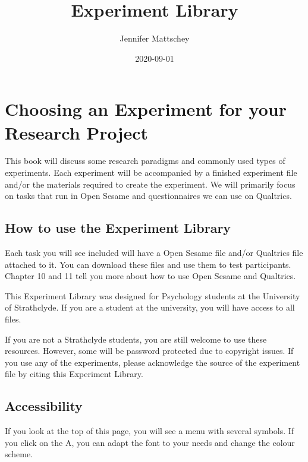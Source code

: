 \documentclass[
]{book}
\title{Experiment Library}
\author{Jennifer Mattschey}
\date{2020-09-01}
\begin{document}
\maketitle

{
\setcounter{tocdepth}{1}
\tableofcontents
}
\hypertarget{choosing-an-experiment-for-your-research-project}{%
\chapter{Choosing an Experiment for your Research Project}\label{choosing-an-experiment-for-your-research-project}}

This book will discuss some research paradigms and commonly used types of experiments. Each experiment will be accompanied by a finished experiment file and/or the materials required to create the experiment. We will primarily focus on tasks that run in Open Sesame and questionnaires we can use on Qualtrics.

\hypertarget{how-to-use-the-experiment-library}{%
\section{How to use the Experiment Library}\label{how-to-use-the-experiment-library}}

Each task you will see included will have a Open Sesame file and/or Qualtrics file attached to it. You can download these files and use them to test participants. Chapter 10 and 11 tell you more about how to use Open Sesame and Qualtrics.

This Experiment Library was designed for Psychology students at the University of Strathclyde. If you are a student at the university, you will have access to all files.

If you are not a Strathclyde students, you are still welcome to use these resources. However, some will be password protected due to copyright issues. If you use any of the experiments, please acknowledge the source of the experiment file by citing this Experiment Library.

\hypertarget{accessibility}{%
\section{Accessibility}\label{accessibility}}

If you look at the top of this page, you will see a menu with several symbols. If you click on the A, you can adapt the font to your needs and change the colour scheme.
\end{document}
